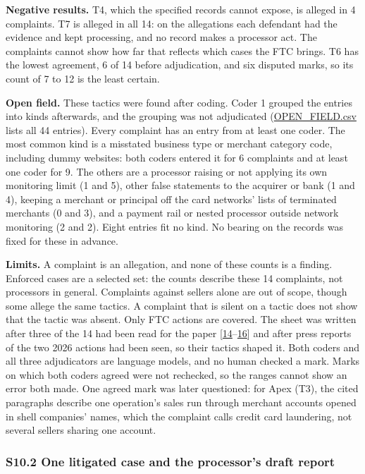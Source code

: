\documentclass[
  11pt,
]{article}
\begin{document}
\textbf{Negative results.} T4, which the specified records cannot
expose, is alleged in 4 complaints. T7 is alleged in all 14: on the
allegations each defendant had the evidence and kept processing, and no
record makes a processor act. The complaints cannot show how far that
reflects which cases the FTC brings. T6 has the lowest agreement, 6 of
14 before adjudication, and six disputed marks, so its count of 7 to 12
is the least certain.

\textbf{Open field.} These tactics were found after coding. Coder 1
grouped the entries into kinds afterwards, and the grouping was not
adjudicated
(\href{tools/complaint_audit/sheets/OPEN_FIELD.csv}{OPEN\_FIELD.csv}
lists all 44 entries). Every complaint has an entry from at least one
coder. The most common kind is a misstated business type or merchant
category code, including dummy websites: both coders entered it for 6
complaints and at least one coder for 9. The others are a processor
raising or not applying its own monitoring limit (1 and 5), other false
statements to the acquirer or bank (1 and 4), keeping a merchant or
principal off the card networks' lists of terminated merchants (0 and
3), and a payment rail or nested processor outside network monitoring (2
and 2). Eight entries fit no kind. No bearing on the records was fixed
for these in advance.

\textbf{Limits.} A complaint is an allegation, and none of these counts
is a finding. Enforced cases are a selected set: the counts describe
these 14 complaints, not processors in general. Complaints against
sellers alone are out of scope, though some allege the same tactics. A
complaint that is silent on a tactic does not show that the tactic was
absent. Only FTC actions are covered. The sheet was written after three
of the 14 had been read for the paper
{[}\protect\hyperlink{ref-FTC2020FirstData}{14}--\protect\hyperlink{ref-FTC2019Allied}{16}{]}
and after press reports of the two 2026 actions had been seen, so their
tactics shaped it. Both coders and all three adjudicators are language
models, and no human checked a mark. Marks on which both coders agreed
were not rechecked, so the ranges cannot show an error both made. One
agreed mark was later questioned: for Apex (T3), the cited paragraphs
describe one operation's sales run through merchant accounts opened in
shell companies' names, which the complaint calls credit card
laundering, not several sellers sharing one account.

\hypertarget{s10.2-one-litigated-case-and-the-processors-draft-report}{%
\subsubsection{S10.2 One litigated case and the processor's draft
report}\label{s10.2-one-litigated-case-and-the-processors-draft-report}}
\end{document}
